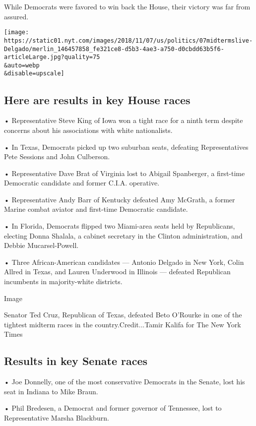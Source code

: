 While Democrats were favored to win back the House, their victory was
far from assured.

\texttt{[image: https://static01.nyt.com/images/2018/11/07/us/politics/07midtermslive-Delgado/merlin\_146457858\_fe321ce8-d5b3-4ae3-a750-d0cbdd63b5f6-articleLarge.jpg?quality=75\\\&auto=webp\\\&disable=upscale]}

\hypertarget{here-are-results-in-key-house-races}{%
\subsection{Here are results in key House
races}\label{here-are-results-in-key-house-races}}

• Representative Steve King of Iowa won a tight race for a ninth term
despite concerns about his associations with white nationalists.

• In Texas, Democrats picked up two suburban seats, defeating
Representatives Pete Sessions and John Culberson.

• Representative Dave Brat of Virginia lost to Abigail Spanberger, a
first-time Democratic candidate and former C.I.A. operative.

• Representative Andy Barr of Kentucky defeated Amy McGrath, a former
Marine combat aviator and first-time Democratic candidate.

• In Florida, Democrats flipped two Miami-area seats held by
Republicans, electing Donna Shalala, a cabinet secretary in the Clinton
administration, and Debbie Mucarsel-Powell.

• Three African-American candidates --- Antonio Delgado in New York,
Colin Allred in Texas, and Lauren Underwood in Illinois --- defeated
Republican incumbents in majority-white districts.

Image

Senator Ted Cruz, Republican of Texas, defeated Beto O'Rourke in one of
the tightest midterm races in the country.Credit...Tamir Kalifa for The
New York Times

\hypertarget{results-in-key-senate-races}{%
\subsection{Results in key Senate
races}\label{results-in-key-senate-races}}

• Joe Donnelly, one of the most conservative Democrats in the Senate,
lost his seat in Indiana to Mike Braun.

• Phil Bredesen, a Democrat and former governor of Tennessee, lost to
Representative Marsha Blackburn.

